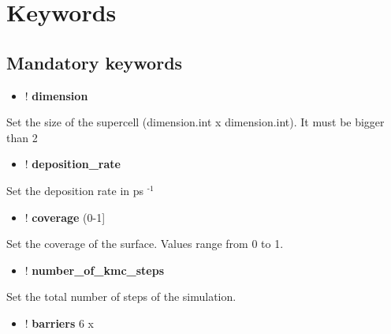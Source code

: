 \documentclass[letterpaper,10pt,english]{sphinxmanual}
\begin{document}
\section{Keywords}
\label{keywords:id1}

\subsection{Mandatory keywords}
\label{keywords:mandatory-keywords}\begin{itemize}
\item {} 
! \textbf{dimension} 

\end{itemize}

Set the size of the supercell (dimension.int x dimension.int). It must be
bigger than 2
\begin{itemize}
\item {} 
! \textbf{deposition\_rate} 

\end{itemize}

Set the deposition rate in ps $^{\text{-1}}$
\begin{itemize}
\item {} 
! \textbf{coverage}   (0-1{]}

\end{itemize}

Set the coverage of the surface. Values range from 0 to 1.
\begin{itemize}
\item {} 
! \textbf{number\_of\_kmc\_steps} 

\end{itemize}

Set the total number of steps of the simulation.
\begin{itemize}
\item {} 
! \textbf{barriers} 6 x 

\end{itemize}
\end{document}
